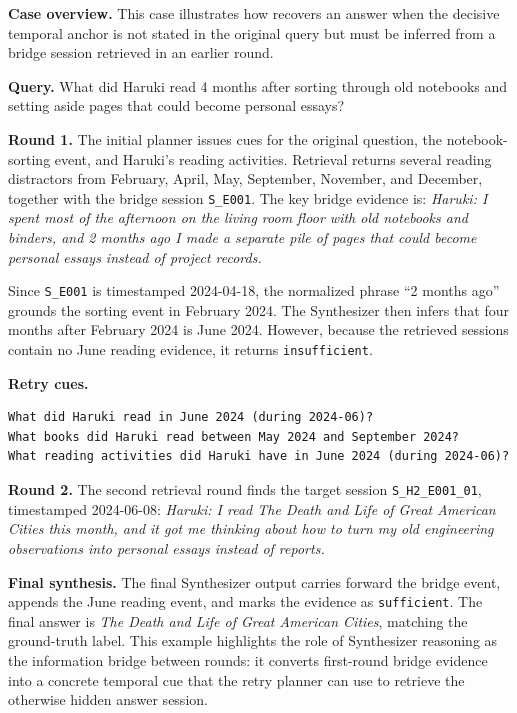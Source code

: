 \begin{tcolorbox}[appendixexample,title={Case Study: Temporal Bridge Retrieval}]
\textbf{Case overview.}
This case illustrates how \sys recovers an answer when the decisive temporal
anchor is not stated in the original query but must be inferred from a bridge
session retrieved in an earlier round.

\smallskip
\textbf{Query.}
What did Haruki read 4 months after sorting through old notebooks and setting
aside pages that could become personal essays?

\smallskip
\textbf{Round 1.}
The initial planner issues cues for the original question, the notebook-sorting
event, and Haruki's reading activities. Retrieval returns several reading
distractors from February, April, May, September, November, and December,
together with the bridge session \texttt{S\_E001}. The key bridge evidence is:
\emph{Haruki: I spent most of the afternoon on the living room floor with old
notebooks and binders, and 2 months ago I made a separate pile of pages that
could become personal essays instead of project records.}

\smallskip
Since \texttt{S\_E001} is timestamped 2024-04-18, the normalized phrase ``2
months ago'' grounds the sorting event in February 2024. The Synthesizer then
infers that four months after February 2024 is June 2024. However, because the
retrieved sessions contain no June reading evidence, it returns
\texttt{insufficient}.

\smallskip
\textbf{Retry cues.}
\begin{Verbatim}[fontsize=\scriptsize,formatcom=\linespread{0.82}\selectfont,breaklines=true,breakanywhere=true]
What did Haruki read in June 2024 (during 2024-06)?
What books did Haruki read between May 2024 and September 2024?
What reading activities did Haruki have in June 2024 (during 2024-06)?
\end{Verbatim}

\smallskip
\textbf{Round 2.}
The second retrieval round finds the target session
\texttt{S\_H2\_E001\_01}, timestamped 2024-06-08:
\emph{Haruki: I read The Death and Life of Great American Cities this month,
and it got me thinking about how to turn my old engineering observations into
personal essays instead of reports.}

\smallskip
\textbf{Final synthesis.}
The final Synthesizer output carries forward the bridge event, appends the June
reading event, and marks the evidence as \texttt{sufficient}. The final answer
is \emph{The Death and Life of Great American Cities}, matching the ground-truth
label. This example highlights the role of Synthesizer reasoning as the
information bridge between rounds: it converts first-round bridge evidence into
a concrete temporal cue that the retry planner can use to retrieve the otherwise
hidden answer session.
\end{tcolorbox}
